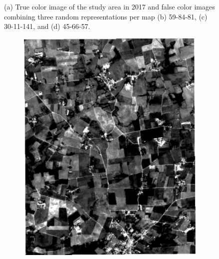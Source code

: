 \documentclass[journal,article,submit,pdftex,moreauthors]{Definitions/mdpi}
\begin{document}
\begin{figure}[H]
\begin{subfigure}[t]{0.23\linewidth}
    \caption{}
	\label{fig:color_map_c}
	\end{subfigure}
	\caption{(a) True color image of the study area in 2017 and false color images combining three random representations per map (b) 59-84-81, (c) 30-11-141, and (d) 45-66-57.}
	\label{color_maps}
\end{figure}

\begin{figure}[H]
	\centering
	\begin{subfigure}[t]{0.23\linewidth}
		\centering
		\includegraphics[height=\linewidth,width=0.95\linewidth]{figures/reconstruction_errors/reconstruction_B2_AEs0.pdf}
	\caption{}
	\label{fig:r_aes_b2_0}
	\end{subfigure}
	\begin{subfigure}[t]{0.23\linewidth}
		\centering

\end{subfigure}
\end{figure}
\end{document}
